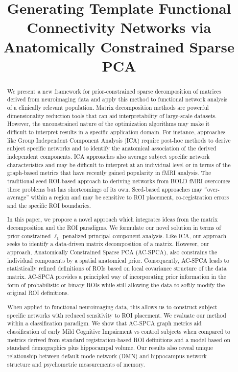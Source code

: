 \documentclass{article}
\begin{document}
\vspace{-0.1in}
\title{Generating Template Functional Connectivity Networks via Anatomically Constrained Sparse PCA}
\maketitle              
\begin{abstract}
We present a new framework for prior-constrained sparse decomposition of matrices derived from neuroimaging data and apply this method to functional network analysis of a clinically relevant population. Matrix decomposition methods are powerful dimensionality reduction tools that can aid interpretability of large-scale datasets.  However, the unconstrained nature of the optimization algorithms may make it difficult to interpret results in a specific application domain.  
For instance, approaches like Group Independent Component Analysis (ICA) require post-hoc methods to derive subject specific networks and to identify the anatomical association of the derived independent components.  ICA approaches also average subject specific network characteristics and may be difficult to interpret at an individual level or in terms of the graph-based metrics that have recently gained popularity in fMRI analysis.  The traditional seed ROI-based approach to deriving networks from BOLD fMRI overcomes these problems but has shortcomings of its own.  Seed-based approaches may ``over-average'' within a region and may be sensitive to ROI placement, co-registration errors and the specific ROI boundaries. 

In this paper, we propose a novel approach which integrates ideas from the matrix decomposition and the ROI paradigms.  We formulate our novel solution in terms of prior-constrained $\ell_1$ penalized principal component analysis. Like ICA, our approach seeks to identify a data-driven matrix decomposition of a matrix.  However, our approach,  Anatomically Constrained Sparse PCA (AC-SPCA), also constrains the individual components by a spatial anatomical prior. Consequently, AC-SPCA leads to statistically refined definitions of ROIs based on local covariance structure of the data matrix. AC-SPCA provides a principled way of incorporating prior information in the form of probabilistic or binary ROIs while still allowing the data to softly modify the original ROI definitions. 

When applied to functional neuroimaging data, this allows us to construct subject specific networks with reduced sensitivity to ROI placement.  We evaluate our method within a classification paradigm.  We show that AC-SPCA graph metrics aid classification of early Mild Cognitive Impairment vs control subjects when compared to metrics derived from standard registration-based ROI definitions and a model based on standard demographics plus hippocampal volume.  Our results also reveal unique relationship between default mode network (DMN) and hippocampus network structure and psychometric measurements of memory. 
\end{abstract}
\end{document}
